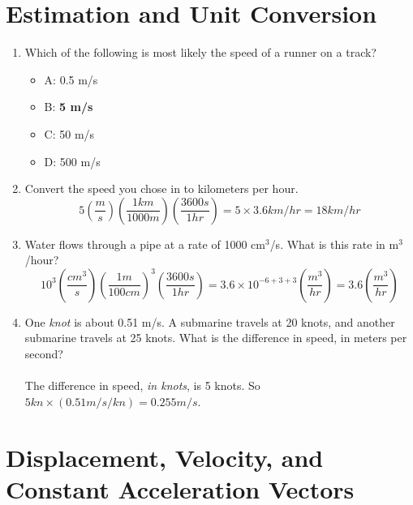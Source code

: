 \documentclass[10pt]{article}
\begin{document}
\maketitle

\section{Estimation and Unit Conversion}
\begin{enumerate}
\item Which of the following is most likely the speed of a runner on a track?
\begin{itemize}
\item A: 0.5 m/s
\item B: \textbf{5 m/s}
\item C: 50 m/s
\item D: 500 m/s
\end{itemize}
\item Convert the speed you chose in to kilometers per hour. \\
\begin{equation}
5 \left(\frac{m}{s}\right) \left(\frac{1 km}{1000 m}\right) \left(\frac{3600 s}{1 hr}\right) = 5 \times 3.6 km/hr = 18 km/hr
\end{equation}
\item Water flows through a pipe at a rate of 1000 cm$^3$/s.  What is this rate in m$^3$/hour? \\
\begin{equation}
10^3 \left(\frac{cm^3}{s}\right) \left(\frac{1 m}{100 cm}\right)^3 \left(\frac{3600 s}{1 hr}\right) = 3.6 \times 10^{-6+3+3} \left(\frac{m^3}{hr}\right) = 3.6 \left(\frac{m^3}{hr}\right) 
\end{equation}
\item One \textit{knot} is about 0.51 m/s.  A submarine travels at 20 knots, and another submarine travels at 25 knots.  What is the difference in speed, in meters per second? \\ \\
The difference in speed, \textit{in knots}, is 5 knots.  So $5 kn \times (0.51 m/s / kn) = 0.255 m/s$.
\end{enumerate}

\section{Displacement, Velocity, and Constant Acceleration Vectors}
\end{document}
